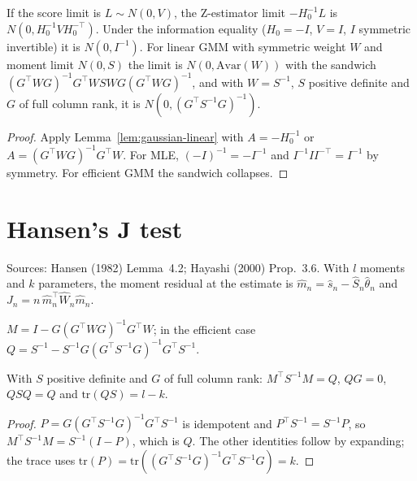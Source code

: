 \begin{theorem}
\label{thm:limit-laws}
\leanok
{}
If the score limit is $L\sim N(0,V)$, the Z-estimator limit $-H_0^{-1}L$ is $N(0, H_0^{-1}VH_0^{-\top})$. Under the
information equality ($H_0 = -I$, $V = I$, $I$ symmetric invertible) it is $N(0, I^{-1})$. For linear GMM with
symmetric weight $W$ and moment limit $N(0,S)$ the limit is $N(0, \mathrm{Avar}(W))$ with the sandwich
$(G^\top WG)^{-1}G^\top WSWG(G^\top WG)^{-1}$, and with $W = S^{-1}$, $S$ positive definite and $G$ of full column
rank, it is $N(0, (G^\top S^{-1}G)^{-1})$.
\end{theorem}
\begin{proof}
\leanok
Apply Lemma~\ref{lem:gaussian-linear} with $A = -H_0^{-1}$ or $A = (G^\top WG)^{-1}G^\top W$. For MLE,
$(-I)^{-1} = -I^{-1}$ and $I^{-1} I I^{-\top} = I^{-1}$ by symmetry. For efficient GMM the sandwich collapses.
\end{proof}

\section{Hansen's J test}
\label{sec:jtest}

Sources: Hansen (1982) Lemma~4.2; Hayashi (2000) Prop.~3.6. With $l$ moments and $k$ parameters, the moment residual
at the estimate is $\hat m_n = \hat s_n - \hat S_n\hat\theta_n$ and $J_n = n\,\hat m_n^\top \hat W_n \hat m_n$.

\begin{definition}
\label{def:jstat}
\leanok
$M = I - G(G^\top WG)^{-1}G^\top W$; in the efficient case
$Q = S^{-1} - S^{-1}G(G^\top S^{-1}G)^{-1}G^\top S^{-1}$.
\end{definition}

\begin{lemma}
\label{lem:jform}
\leanok
{}
With $S$ positive definite and $G$ of full column rank: $M^\top S^{-1}M = Q$, $QG = 0$, $QSQ = Q$ and
$\mathrm{tr}(QS) = l - k$.
\end{lemma}
\begin{proof}
\leanok
$P = G(G^\top S^{-1}G)^{-1}G^\top S^{-1}$ is idempotent and $P^\top S^{-1} = S^{-1}P$, so
$M^\top S^{-1}M = S^{-1}(I-P)$, which is $Q$. The other identities follow by expanding; the trace uses
$\mathrm{tr}(P) = \mathrm{tr}((G^\top S^{-1}G)^{-1}G^\top S^{-1}G) = k$.
\end{proof}

